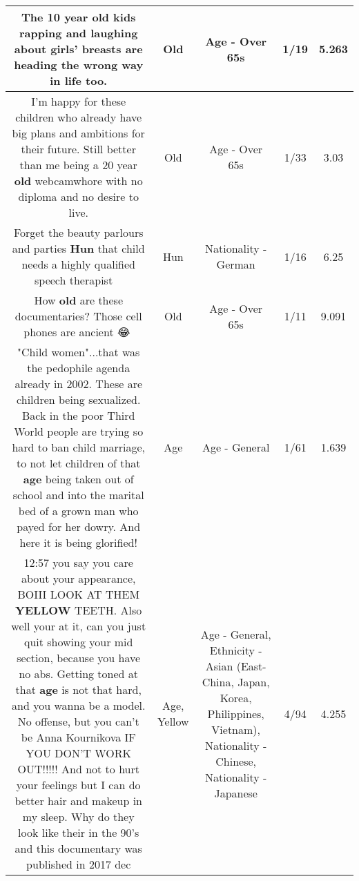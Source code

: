 \documentclass[11pt]{article}
\newlength\mylength
\begin{document}
\begin{center}
\begin{longtable}{|C{.65\mylength}|C{.30\mylength}|C{.12\mylength}|C{.12\mylength}|C{.12\mylength}|}
  \small The 10 year \textbf{old} kids rapping and laughing about girls' breasts are heading the wrong way in life too.\normalsize   & Old & Age - Over 65s & 1/19 & 5.263 \\  \hline
  \small I'm happy for these children who already have big plans and ambitions for their future. Still better than me being a 20 year \textbf{old} webcamwhore with no diploma and no desire to live.\normalsize   & Old & Age - Over 65s & 1/33 & 3.03 \\  \hline
  \small Forget the beauty parlours and parties \textbf{Hun} that child needs a highly qualified speech therapist 🤷‍♀️\normalsize   & Hun & Nationality - German & 1/16 & 6.25 \\  \hline
  \small How \textbf{old} are these documentaries? Those cell phones are ancient 😂🤣\normalsize   & Old & Age - Over 65s & 1/11 & 9.091 \\  \hline
  \small "Child women"...that was the pedophile agenda already in 2002. These are children being sexualized. Back in the poor Third World people are trying so hard to ban child marriage, to not let children of that \textbf{age} being taken out of school and into the marital bed of a grown man who payed for her dowry. And here it is being glorified!\normalsize   & Age & Age - General & 1/61 & 1.639 \\  \hline
  \small 12:57  you say you care about your appearance, BOIII LOOK AT THEM \textbf{Y\textbf{E\textbf{LLOW}}} TEETH. Also well your at it, can you just quit showing your mid section, because you have no abs. Getting toned at that \textbf{age} is not that hard, and you wanna be a model. No offense, but you can't be Anna Kournikova IF YOU DON'T WORK OUT!!!!! And not to hurt your feelings but I can do better hair and makeup in my sleep. Why do they look like their in the 90's and this documentary was published in 2017 dec\normalsize   & Age, Yellow & Age - General, Ethnicity - Asian (East- China, Japan, Korea, Philippines, Vietnam), Nationality - Chinese, Nationality - Japanese & 4/94 & 4.255 \\  \hline

\end{longtable}
\end{center}
\end{document}
